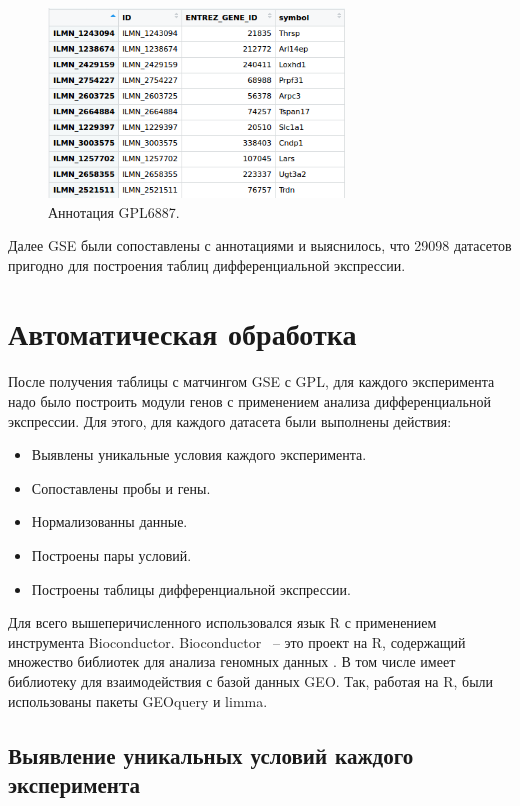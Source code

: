 \documentclass[times,specification,annotation]{itmo-student-thesis}
\begin{document}
\begin{figure}[!h]
    \caption{Аннотация GPL6887.}\label{GPL6887}
    \centering
    \includegraphics[width=0.7\textwidth]{GPL6887.png}
\end{figure} 

Далее GSE были сопоставлены с аннотациями и выяснилось, что 29098 датасетов пригодно для построения таблиц ​дифференциальной экспрессии.


\section{Автоматическая обработка}

После получения таблицы с матчингом GSE с GPL, для каждого эксперимента надо было построить модули генов с применением анализа дифференциальной экспрессии. Для этого, для каждого датасета были выполнены действия:
\begin{itemize}
    \item Выявлены уникальные условия каждого эксперимента.
    \item Сопоставлены пробы и гены.
    \item Нормализованны данные.
    \item Построены пары условий.
    \item Построены таблицы дифференциальной экспрессии.
\end{itemize}

Для всего вышеперичисленного использовался язык R с применением инструмента Bioconductor. Bioconductor ~-- это проект на R, содержащий множество библиотек для анализа геномных данных \cite{Bioconductor}. В том числе имеет библиотеку для взаимодействия с базой данных GEO. Так, работая на R, были использованы пакеты GEOquery и limma. 

\subsection{Выявление уникальных условий каждого эксперимента}
\end{document}
